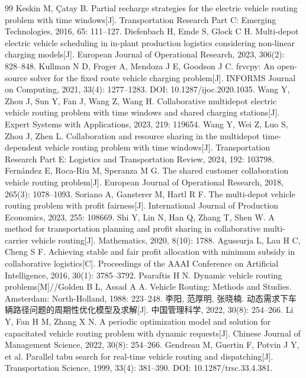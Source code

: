 \documentclass{setp-new}
\begin{document}
\begin{thebibliography}{99}
 Keskin M, \c{C}atay B. Partial recharge strategies for the electric vehicle routing problem with time windows[J]. Transportation Research Part C: Emerging Technologies, 2016, 65: 111--127.
 Diefenbach H, Emde S, Glock C H. Multi-depot electric vehicle scheduling in in-plant production logistics considering non-linear charging models[J]. European Journal of Operational Research, 2023, 306(2): 828--848.
 Kullman N D, Froger A, Mendoza J E, Goodson J C. frvcpy: An open-source solver for the fixed route vehicle charging problem[J]. INFORMS Journal on Computing, 2021, 33(4): 1277--1283. DOI: 10.1287/ijoc.2020.1035.
 Wang Y, Zhou J, Sun Y, Fan J, Wang Z, Wang H. Collaborative multidepot electric vehicle routing problem with time windows and shared charging stations[J]. Expert Systems with Applications, 2023, 219: 119654.
 Wang Y, Wei Z, Luo S, Zhou J, Zhen L. Collaboration and resource sharing in the multidepot time-dependent vehicle routing problem with time windows[J]. Transportation Research Part E: Logistics and Transportation Review, 2024, 192: 103798.
 Fern\'andez E, Roca-Riu M, Speranza M G. The shared customer collaboration vehicle routing problem[J]. European Journal of Operational Research, 2018, 265(3): 1078--1093.
 Soriano A, Gansterer M, Hartl R F. The multi-depot vehicle routing problem with profit fairness[J]. International Journal of Production Economics, 2023, 255: 108669.
 Shi Y, Lin N, Han Q, Zhang T, Shen W. A method for transportation planning and profit sharing in collaborative multi-carrier vehicle routing[J]. Mathematics, 2020, 8(10): 1788.
 Agussurja L, Lau H C, Cheng S F. Achieving stable and fair profit allocation with minimum subsidy in collaborative logistics[C]. Proceedings of the AAAI Conference on Artificial Intelligence, 2016, 30(1): 3785--3792.
 Psaraftis H N. Dynamic vehicle routing problems[M]//Golden B L, Assad A A. Vehicle Routing: Methods and Studies. Amsterdam: North-Holland, 1988: 223--248.
 李阳, 范厚明, 张晓楠. 动态需求下车辆路径问题的周期性优化模型及求解[J]. 中国管理科学, 2022, 30(8): 254--266. Li Y, Fan H M, Zhang X N. A periodic optimization model and solution for capacitated vehicle routing problem with dynamic requests[J]. Chinese Journal of Management Science, 2022, 30(8): 254--266.
 Gendreau M, Guertin F, Potvin J Y, et al. Parallel tabu search for real-time vehicle routing and dispatching[J]. Transportation Science, 1999, 33(4): 381--390. DOI: 10.1287/trsc.33.4.381.

\end{thebibliography}
\end{document}
